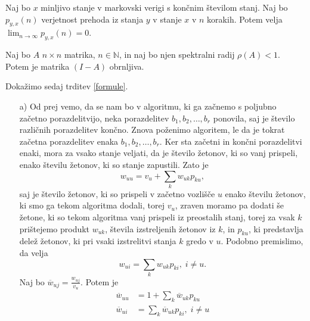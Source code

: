 \documentclass[twoside,11pt]{article}
\begin{document}
\begin{lema}\label{markovske}
    Naj bo $x$ minljivo stanje v markovski verigi s končnim številom stanj. Naj bo $p_{y,x}(n)$ verjetnost prehoda iz stanja $y$ v stanje $x$ v $n$ korakih. Potem velja $\lim_{n \to \infty} p_{y,x}(n) = 0$.
\end{lema}

\begin{lema}\label{matrike}
    Naj bo $A$ $n\times n$ matrika, $n \in \mathbb{N}$, in naj bo njen spektralni radij $\rho(A)<1$. Potem je matrika $(I-A)$ obrnljiva.
\end{lema}


\noindent Dokažimo sedaj trditev \ref{formule}. \newline
\smallskip

\begin{enumerate}
    \item[a)] Od prej vemo, da se nam bo v algoritmu, ki ga začnemo s poljubno začetno porazdelitvijo, neka porazdelitev $b_{1},b_{2},\ldots,b_{r}$ ponovila, saj je število različnih porazdelitev končno. Znova poženimo algoritem, le da je tokrat začetna porazdelitev enaka $b_{1},b_{2},\ldots,b_{r}$. Ker sta začetni in končni porazdelitvi enaki, mora za vsako stanje veljati, da je število žetonov, ki so vanj prispeli, enako številu žetonov, ki so stanje zapustili. Zato je 
$$w_{uu} = v_{u} + \sum_{k} w_{uk}p_{ku},$$ saj je število žetonov, ki so prispeli v začetno vozlišče $u$ enako številu žetonov, ki smo ga tekom algoritma dodali, torej $v_{u}$, zraven moramo pa dodati še žetone, ki so tekom algoritma vanj prispeli iz preostalih stanj, torej za vsak $k$ prištejemo produkt $w_{uk}$, števila izstreljenih žetonov iz $k$, in $p_{ku}$, ki predstavlja delež žetonov, ki pri vsaki izstrelitvi stanja $k$ gredo v $u$. 
Podobno premislimo, da velja
$$w_{ui} = \sum_{k} w_{uk}p_{ki}, \;i\neq u.$$
Naj bo $\overline{w}_{uj} = \frac{w_{uj}}{v_{u}}$. Potem je 
\[
    \begin{split}
        \overline{w}_{uu} &= 1 + \sum_{k} \overline{w}_{uk}p_{ku} \\
        \overline{w}_{ui} &= \sum_{k} \overline{w}_{uk}p_{ki}, \; i \neq u
    \end{split}
\]


\end{enumerate}
\end{document}
